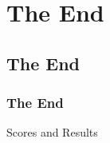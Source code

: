 \documentclass[t,compress,aspectratio=169]{beamer}
\begin{document}



\section{The End}
\subsection{The End}
\begin{frame}
    \frametitle{The End}
    \vspace{0.3cm}
    \begin{block}{}
        \centering\begin{Huge}Scores and Results\end{Huge}
    \end{block}
\end{frame}


% 
% 


\end{document}
